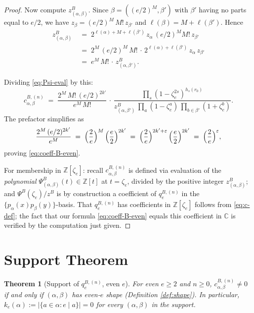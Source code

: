 \documentclass[11pt]{article}
\newtheorem{theorem}{Theorem}
\theoremstyle{definition}
\theoremstyle{remark}
\newcommand{\zetae}{\zeta_e}
\newcommand{\ZZ}{\mathbb{Z}}
\newcommand{\CC}{\mathbb{C}}
\newcommand{\PsiB}{\Psi^{B}}
\newcommand{\zB}{z^{B}}
\newcommand{\eps}{\varepsilon}
\begin{document}
\begin{proof}
Now compute $\zB_{(\alpha, \beta)}$. Since $\beta = ((e/2)^M, \beta')$ with $\beta'$ having no parts equal to $e/2$, we have $z_\beta = (e/2)^{M}\, M!\, z_{\beta'}$ and $\ell(\beta) = M + \ell(\beta')$. Hence
\begin{align*}
  \zB_{(\alpha, \beta)}
  &\;=\; 2^{\ell(\alpha) + M + \ell(\beta')}\, z_\alpha\, (e/2)^{M} M!\, z_{\beta'}\\
  &\;=\; 2^{M}\, (e/2)^{M}\, M!\, \cdot\, 2^{\ell(\alpha) + \ell(\beta')}\, z_\alpha\, z_{\beta'}\\
  &\;=\; e^{M}\, M!\, \cdot\, \zB_{(\alpha, \beta')}.
\end{align*}

Dividing \eqref{eq:Psi-eval} by this:
\[
  c^{B,(n)}_{\alpha, \beta}
  \;=\; \frac{2^{M}\, M!\, (e/2)^{2k'}}{e^{M}\, M!}\, \cdot\, \frac{\prod_s (1 - \zetae^{2s})^{h_s(r_0)}}{\zB_{(\alpha, \beta')}\, \prod_a(1 - \zetae^{a})\, \prod_{b \in \beta'}(1 + \zetae^{b})}.
\]
The prefactor simplifies as
\[
  \frac{2^{M}\, (e/2)^{2k'}}{e^{M}} \;=\; \Bigl(\frac{2}{e}\Bigr)^{M}\, \Bigl(\frac{e}{2}\Bigr)^{2k'} \;=\; \Bigl(\frac{2}{e}\Bigr)^{2k' + \eps}\, \Bigl(\frac{e}{2}\Bigr)^{2k'} \;=\; \Bigl(\frac{2}{e}\Bigr)^{\eps},
\]
proving \eqref{eq:coeff-B-even}.

For membership in $\ZZ[\zetae]$: recall $c^{B,(n)}_{\alpha, \beta}$ is defined via evaluation of the \emph{polynomial} $\PsiB_{(\alpha,\beta)}(t) \in \ZZ[t]$ at $t = \zetae$, divided by the positive integer $\zB_{(\alpha,\beta)}$; and $\PsiB(\zetae)/\zB$ is by construction a coefficient of $q_e^{B, (n)}$ in the $\{p_\alpha(x) p_\beta(y)\}$-basis. That $q_e^{B, (n)}$ has coefficients in $\ZZ[\zetae]$ follows from \eqref{eq:c-def}; the fact that our formula \eqref{eq:coeff-B-even} equals this coefficient in $\CC$ is verified by the computation just given.
\end{proof}

\section{Support Theorem}\label{sec:support}

\begin{theorem}[Support of $q_e^{B, (n)}$, even $e$]\label{thm:support-even}
For even $e \ge 2$ and $n \ge 0$, $c^{B, (n)}_{\alpha, \beta} \ne 0$ if and only if $(\alpha, \beta)$ has even-$e$ shape (Definition \ref{def:shape}). In particular, $k_e(\alpha) := |\{a \in \alpha : e \mid a\}| = 0$ for every $(\alpha, \beta)$ in the support.
\end{theorem}
\end{document}
